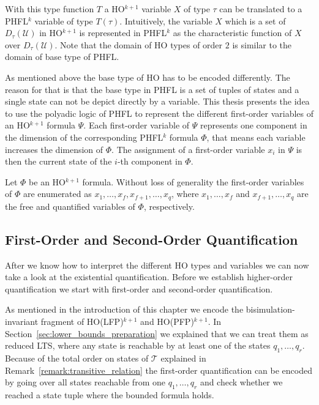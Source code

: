 With this type function $T$ a HO$^{k + 1}$ variable $X$ of type $\tau$ can be translated to a PHFL$^k$ variable
of type $T(\tau)$. Intuitively, the variable $X$ which is a set of $D_\tau(\mathcal{U})$ in HO$^{k+1}$ is represented
in PHFL$^k$ as the characteristic function of $X$ over $D_\tau(\mathcal{U})$. Note that the domain of HO types
of order $2$ is similar to the domain of base type of PHFL.

As mentioned above the base type of HO has to be encoded differently. The reason for that is that the base type in PHFL is a
set of tuples of states and a single state can not be depict directly by a variable. This thesis presents the
idea to use the polyadic logic of PHFL to represent the different first-order variables of an HO$^{k+1}$ formula
$\Psi$. Each first-order variable of $\Psi$ represents one component in the dimension of the 
corresponding PHFL$^k$ formula $\Phi$, that
means each variable increases the dimension of $\Phi$. The assignment of a first-order 
variable $x_i$ in $\Psi$ is then the current state of the $i$-th component in $\Phi$.

Let $\Phi$ be an HO$^{k+1}$ formula. Without loss of generality the first-order variables of $\Phi$ are enumerated as
$x_1, \dots, x_f, x_{f + 1}, \dots, x_q$, where $x_1, \dots, x_f$ and $x_{f+1}, \dots, x_q$ are the free and 
quantified variables of $\Phi$, respectively.

\subsection{First-Order and Second-Order Quantification}\label{subsec:existentialQuantifiers}

After we know how to interpret the different HO types and variables we can now take a look at the existential quantification. Before we establish higher-order quantification we start with first-order and second-order quantification.

As mentioned in the introduction of this chapter we encode the bisimula\-tion-invariant fragment of HO(LFP)$^{k + 1}$ and HO(PFP)$^{k+1}$. In Section~\ref{sec:lower_bounds_preparation}  we explained that we can treat them as reduced LTS, where any state is reachable by at least one of the states $q_1, \dots, q_r$. Because of the total order on states of $\mathcal{T}$ explained in Remark~\ref{remark:transitive_relation} the first-order
quantification can be encoded by going over all states reachable from one $q_1, \dots, q_r$ and check whether we
reached a state tuple where the bounded formula holds.

